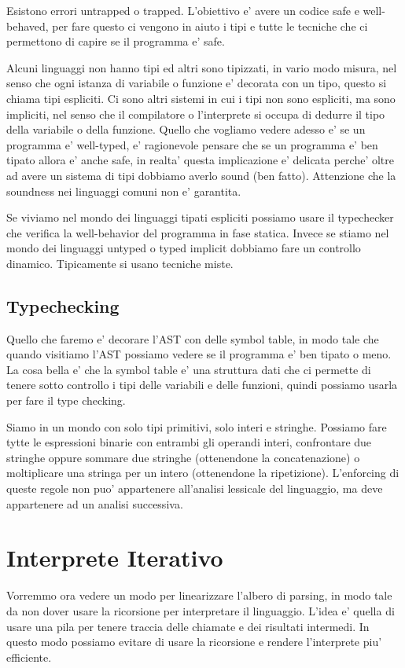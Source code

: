 Esistono errori untrapped o trapped. L'obiettivo e' avere un codice safe e well-behaved, per fare questo ci vengono in aiuto i tipi e tutte le tecniche che ci permettono di capire se il programma e' safe.

Alcuni linguaggi non hanno tipi ed altri sono tipizzati, in vario modo misura, nel senso che ogni istanza di variabile o funzione e' decorata con un tipo, questo si chiama tipi espliciti. Ci sono altri sistemi in cui i tipi non sono espliciti, ma sono impliciti, nel senso che il compilatore o l'interprete si occupa di dedurre il tipo della variabile o della funzione.
Quello che vogliamo vedere adesso e' se un programma e' well-typed, e' ragionevole pensare che se un programma e' ben tipato allora e' anche safe, in realta' questa implicazione e' delicata perche' oltre ad avere un sistema di tipi dobbiamo averlo sound (ben fatto). Attenzione che la soundness nei linguaggi comuni non e' garantita.

Se viviamo nel mondo dei linguaggi tipati espliciti possiamo usare il typechecker che verifica la well-behavior del programma in fase statica. Invece se stiamo nel mondo dei linguaggi untyped o typed implicit dobbiamo fare un controllo dinamico. Tipicamente si usano tecniche miste.

\subsection{Typechecking}

Quello che faremo e' decorare l'AST con delle symbol table, in modo tale che quando visitiamo l'AST possiamo vedere se il programma e' ben tipato o meno. La cosa bella e' che la symbol table e' una struttura dati che ci permette di tenere sotto controllo i tipi delle variabili e delle funzioni, quindi possiamo usarla per fare il type checking.

Siamo in un mondo con solo tipi primitivi, solo interi e stringhe. Possiamo fare tytte le espressioni binarie con entrambi gli operandi interi, confrontare due stringhe oppure sommare due stringhe (ottenendone la concatenazione) o moltiplicare una stringa per un intero (ottenendone la ripetizione). L'enforcing di queste regole non puo' appartenere all'analisi lessicale del linguaggio, ma deve appartenere ad un analisi successiva.

\section{Interprete Iterativo}
Vorremmo ora vedere un modo per linearizzare l'albero di parsing, in modo tale da non dover usare la ricorsione per interpretare il linguaggio. L'idea e' quella di usare una pila per tenere traccia delle chiamate e dei risultati intermedi. In questo modo possiamo evitare di usare la ricorsione e rendere l'interprete piu' efficiente.


